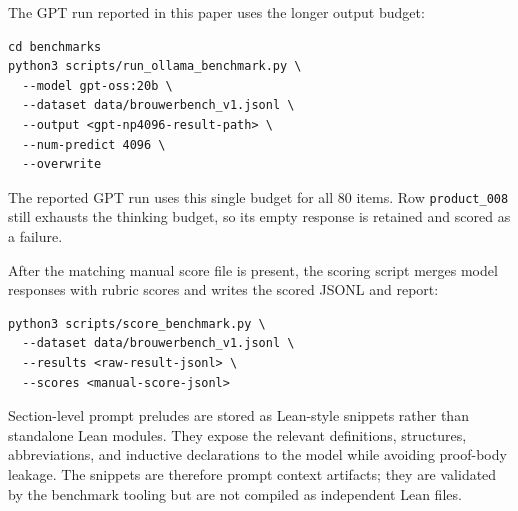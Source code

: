 \documentclass{article}
\theoremstyle{definition}
\begin{document}
The GPT run reported in this paper uses the longer output budget:
\begin{verbatim}
cd benchmarks
python3 scripts/run_ollama_benchmark.py \
  --model gpt-oss:20b \
  --dataset data/brouwerbench_v1.jsonl \
  --output <gpt-np4096-result-path> \
  --num-predict 4096 \
  --overwrite
\end{verbatim}

The reported GPT run uses this single budget for all 80 items. Row \texttt{product\_008} still exhausts the thinking budget, so its empty response is retained and scored as a failure.

After the matching manual score file is present, the scoring script merges model responses with rubric scores and writes the scored JSONL and report:
\begin{verbatim}
python3 scripts/score_benchmark.py \
  --dataset data/brouwerbench_v1.jsonl \
  --results <raw-result-jsonl> \
  --scores <manual-score-jsonl>
\end{verbatim}

Section-level prompt preludes are stored as Lean-style snippets rather than standalone Lean modules. They expose the relevant definitions, structures, abbreviations, and inductive declarations to the model while avoiding proof-body leakage. The snippets are therefore prompt context artifacts; they are validated by the benchmark tooling but are not compiled as independent Lean files.
\end{document}
